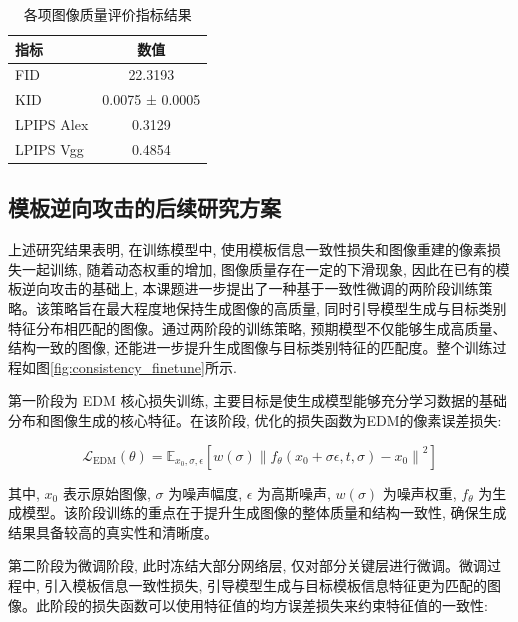 \begin{table}[htbp]
  \centering
  \begin{tabular}{lc}
    \hline
    指标         & 数值              \\
    \hline
    FID        & 22.3193         \\
    KID        & 0.0075 ± 0.0005 \\
    LPIPS Alex & 0.3129          \\
    LPIPS Vgg  & 0.4854          \\
    \hline
  \end{tabular}
  \caption{各项图像质量评价指标结果}
  \label{tab:quality_metrics}
\end{table}



\subsection{模板逆向攻击的后续研究方案}
\label{sec:tia_finetune}

上述研究结果表明, 在训练模型中, 使用模板信息一致性损失和图像重建的像素损失一起训练, 随着动态权重的增加, 图像质量存在一定的下滑现象, 因此在已有的模板逆向攻击的基础上, 本课题进一步提出了一种基于一致性微调的两阶段训练策略。该策略旨在最大程度地保持生成图像的高质量, 同时引导模型生成与目标类别特征分布相匹配的图像。通过两阶段的训练策略, 预期模型不仅能够生成高质量、结构一致的图像, 还能进一步提升生成图像与目标类别特征的匹配度。整个训练过程如图\ref{fig:consistency_finetune}所示.

第一阶段为 EDM 核心损失训练, 主要目标是使生成模型能够充分学习数据的基础分布和图像生成的核心特征。在该阶段, 优化的损失函数为EDM的像素误差损失:

\[
  \mathcal{L}_{\text{EDM}}(\theta) = \mathbb{E}_{x_0, \sigma, \epsilon} \left[ w(\sigma) \left\| f_\theta(x_0 + \sigma \epsilon, t, \sigma) - x_0 \right\|^2 \right]
\]

其中, $x_0$ 表示原始图像, $\sigma$ 为噪声幅度, $\epsilon$ 为高斯噪声, $w(\sigma)$ 为噪声权重, $f_\theta$ 为生成模型。该阶段训练的重点在于提升生成图像的整体质量和结构一致性, 确保生成结果具备较高的真实性和清晰度。

第二阶段为微调阶段, 此时冻结大部分网络层, 仅对部分关键层进行微调。微调过程中, 引入模板信息一致性损失, 引导模型生成与目标模板信息特征更为匹配的图像。此阶段的损失函数可以使用特征值的均方误差损失来约束特征值的一致性:

